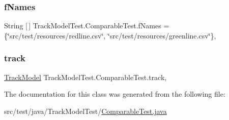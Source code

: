 \subsubsection{\texorpdfstring{f\+Names}{fNames}}
{\footnotesize\ttfamily String \mbox{[}$\,$\mbox{]} Track\+Model\+Test.\+Comparable\+Test.\+f\+Names = \{\char`\"{}src/test/resources/redline.\+csv\char`\"{}, \char`\"{}src/test/resources/greenline.\+csv\char`\"{}\}\hspace{0.3cm}{\ttfamily [static]}, {\ttfamily [private]}}

\mbox{\label{classTrackModelTest_1_1ComparableTest_aecca898547ff5a1894e5739f9ba69124}} 
\subsubsection{\texorpdfstring{track}{track}}
{\footnotesize\ttfamily \hyperlink{classTrackModel_1_1TrackModel}{Track\+Model} Track\+Model\+Test.\+Comparable\+Test.\+track\hspace{0.3cm}{\ttfamily [static]}, {\ttfamily [private]}}



The documentation for this class was generated from the following file\+:\begin{DoxyCompactItemize}
\item 
src/test/java/\+Track\+Model\+Test/\hyperlink{ComparableTest_8java}{Comparable\+Test.\+java}\end{DoxyCompactItemize}
